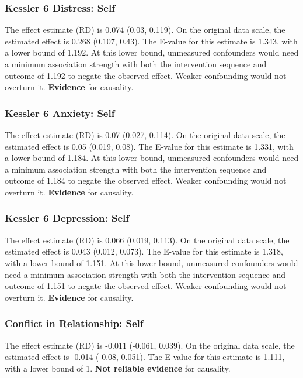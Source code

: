 \documentclass[
  singlecolumn]{article}
\begin{document}
\subsubsection{Kessler 6 Distress:
Self}\label{kessler-6-distress-self-5}

The effect estimate (RD) is 0.074 (0.03, 0.119). On the original data
scale, the estimated effect is 0.268 (0.107, 0.43). The E-value for this
estimate is 1.343, with a lower bound of 1.192. At this lower bound,
unmeasured confounders would need a minimum association strength with
both the intervention sequence and outcome of 1.192 to negate the
observed effect. Weaker confounding would not overturn it.
\textbf{Evidence} for causality.

\subsubsection{Kessler 6 Anxiety: Self}\label{kessler-6-anxiety-self-5}

The effect estimate (RD) is 0.07 (0.027, 0.114). On the original data
scale, the estimated effect is 0.05 (0.019, 0.08). The E-value for this
estimate is 1.331, with a lower bound of 1.184. At this lower bound,
unmeasured confounders would need a minimum association strength with
both the intervention sequence and outcome of 1.184 to negate the
observed effect. Weaker confounding would not overturn it.
\textbf{Evidence} for causality.

\subsubsection{Kessler 6 Depression:
Self}\label{kessler-6-depression-self-5}

The effect estimate (RD) is 0.066 (0.019, 0.113). On the original data
scale, the estimated effect is 0.043 (0.012, 0.073). The E-value for
this estimate is 1.318, with a lower bound of 1.151. At this lower
bound, unmeasured confounders would need a minimum association strength
with both the intervention sequence and outcome of 1.151 to negate the
observed effect. Weaker confounding would not overturn it.
\textbf{Evidence} for causality.

\subsubsection{Conflict in Relationship:
Self}\label{conflict-in-relationship-self-5}

The effect estimate (RD) is -0.011 (-0.061, 0.039). On the original data
scale, the estimated effect is -0.014 (-0.08, 0.051). The E-value for
this estimate is 1.111, with a lower bound of 1. \textbf{Not reliable
evidence} for causality.
\end{document}
